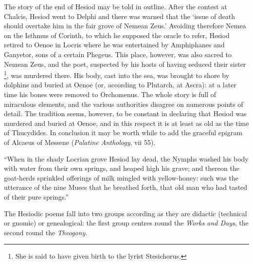 The story of the end of Hesiod may be told in outline. After the contest at
Chalcis, Hesiod went to Delphi and there was warned that the ‘issue of
death should overtake him in the fair grove of Nemean Zeus.’ Avoiding
therefore Nemea on the Isthmus of Corinth, to which he supposed the oracle to
refer, Hesiod retired to Oenoe in Locris where he was entertained by
Amphiphanes and Ganyetor, sons of a certain Phegeus. This place, however, was
also sacred to Nemean Zeus, and the poet, suspected by his hosts of having
seduced their sister \footnote{She is said to have given
birth to the lyrist Stesichorus.}, was murdered there. His body,
cast into the sea, was brought to shore by dolphins and buried at Oenoe (or,
according to Plutarch, at Ascra): at a later time his bones were removed to
Orchomenus. The whole story is full of miraculous elements, and the various
authorities disagree on numerous points of detail. The tradition seems,
however, to be constant in declaring that Hesiod was murdered and buried at
Oenoe, and in this respect it is at least as old as the time of Thucydides. In
conclusion it may be worth while to add the graceful epigram of Alcaeus of
Messene (\emph{Palatine Anthology}, vii 55).

“When in the shady Locrian grove Hesiod lay dead, the Nymphs washed his
body with water from their own springs, and heaped high his grave; and thereon
the goat-herds sprinkled offerings of milk mingled with yellow-honey: such was
the utterance of the nine Muses that he breathed forth, that old man who had
tasted of their pure springs.”


The Hesiodic poems fall into two groups according as they are didactic
(technical or gnomic) or genealogical: the first group centres round the
\emph{Works and Days}, the second round the \emph{Theogony}.


